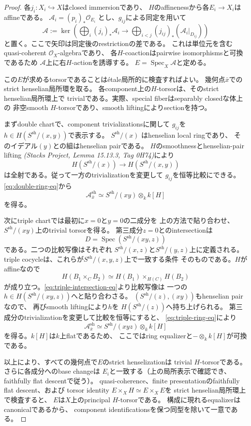 \documentclass[uplatex,dvipdfmx,11pt]{jsarticle}
\numberwithin{equation}{section}
\theoremstyle{plain}
\theoremstyle{definition}
\theoremstyle{remark}
\newcommand{\OO}{\mathcal O}
\begin{document}
\begin{proof}
各$j_i:X_i\hookrightarrow X$はclosed immersionであり、
$H$のaffinenessから各$E_i\to X_i$はaffineである。
$\mathcal A_i=(p_i)_*\OO_{E_i}$ とし、$g_{ij}$による同定を用いて
\begin{equation}\label{eq:torsor-algebra-equalizer}
\mathcal A:=\ker\left(
\bigoplus_i(j_i)_*\mathcal A_i\longrightarrow
\bigoplus_{i<j}(j_{ij})_*(\mathcal A_i|_{D_{ij}})
\right)
\end{equation}
と置く。ここで矢印は同定後のrestrictionの差である。
これは単位元を含むquasi-coherent $\OO_X$-algebraであり、
各$H$-coactionはpairwise isomorphismsと可換であるため
$\mathcal A$上に右$H$-actionを誘導する。
$E=\operatorname{Spec}_X\mathcal A$と定める。

この$E$が求めるtorsorであることはétale局所的に検査すればよい。
幾何点$\bar x$でのstrict henselian局所環を取る。
各component上の$H$-torsorは、そのstrict henselian局所環上で
trivialである。実際、special fiberはseparably closedな体上の
非空smooth $H$-torsorであり、smooth liftingによりsectionを持つ。

まずdouble chartで、component trivializationsに関して
$g_{ij}$を$h\in H(S^{\mathrm{sh}}/(x,y))$で表示する。
$S^{\mathrm{sh}}/(x)$ はhenselian local ringであり、
そのイデアル$(y)$との組はhenselian pairである。
$H$のsmoothnessとhenselian-pair lifting
\emph{(Stacks Project, Lemma 15.13.3, Tag 0H74)}により
\[
H(S^{\mathrm{sh}}/(x))\longrightarrow
H(S^{\mathrm{sh}}/(x,y))
\]
は全射である。従って一方のtrivializationを変更して
$g_{ij}$を恒等比較にできる。\eqref{eq:double-ring-eq}から
\[\mathcal A_{\bar x}^{\mathrm{sh}}
\simeq S^{\mathrm{sh}}/(xy)\otimes_k k[H]\]
を得る。

次にtriple chartでは最初に$x=0$と$y=0$の二成分を
上の方法で貼り合わせ、$S^{\mathrm{sh}}/(xy)$上のtrivial torsorを得る。
第三成分$z=0$とのintersectionは
\[
D=\operatorname{Spec}(S^{\mathrm{sh}}/(xy,z))
\]
である。二つの比較写像はそれぞれ
$S^{\mathrm{sh}}/(x,z)$と$S^{\mathrm{sh}}/(y,z)$上に定義される。
triple cocycleは、これらが$S^{\mathrm{sh}}/(x,y,z)$上で一致する条件
そのものである。$H$がaffineなので
\[
H(B_1\times_C B_2)
\simeq H(B_1)\times_{H(C)}H(B_2)
\]
が成り立つ。\eqref{eq:triple-intersection-eq}より比較写像は
一つの$h\in H(S^{\mathrm{sh}}/(xy,z))$へと貼り合わさる。
$(S^{\mathrm{sh}}/(z),(xy))$もhenselian pairなので、
再びsmooth liftingにより$h$を
$H(S^{\mathrm{sh}}/(z))$へ持ち上げられる。
第三成分のtrivializationを変更して比較を恒等にすると、
\eqref{eq:triple-ring-eq}により
\[
\mathcal A_{\bar x}^{\mathrm{sh}}
\simeq S^{\mathrm{sh}}/(xyz)\otimes_k k[H]
\]
を得る。$k[H]$は$k$上flatであるため、
ここではring equalizerと$-\otimes_k k[H]$が可換である。

以上により、すべての幾何点で$E$のstrict henselizationは
trivial $H$-torsorである。さらに各成分へのbase changeは
$E_i$と一致する（上の局所表示で確認でき、faithfully flat descentで従う）。
quasi-coherence、finite presentationのfaithfully flat descent、および
torsor identity $E\times_X H\simeq E\times_X E$を
strict henselian局所環上で検査すると、
$E$は$X$上のprincipal $H$-torsorである。
構成に現れるequalizerはcanonicalであるから、
component identificationsを保つ同型を除いて一意である。
\end{proof}
\end{document}
